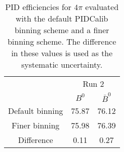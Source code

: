 \begin{table}
    \centering
    \begin{tabular}{ccc}
    \toprule
& \multicolumn{2}{c}{Run 2}\\
& $B^0$ & $\bar{B}^0$\\
    \midrule
Default binning & 75.87 & 76.12\\
Finer binning & 75.98 & 76.39\\
Difference & 0.11 & 0.27\\
    \bottomrule
    \end{tabular}
    \caption{PID efficiencies for $4\pi$ evaluated with the default PIDCalib binning scheme and a finer binning scheme. The difference in these values is used as the systematic uncertainty.}
\label{tab:final_PID_pipipipi}
\end{table}
